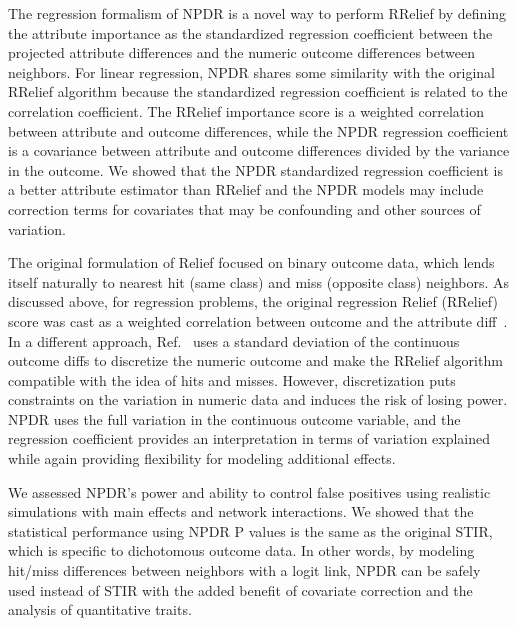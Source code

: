 \documentclass[10pt]{article}
\begin{document}
The regression formalism of NPDR is a novel way to perform RRelief by defining the attribute importance as the standardized regression coefficient between the projected attribute differences and the numeric outcome differences between neighbors.
For linear regression, NPDR shares some similarity with the original RRelief algorithm because the standardized regression coefficient is related to the correlation coefficient.
The RRelief importance score is a weighted correlation between attribute and outcome differences, while the NPDR regression coefficient is a covariance between attribute and outcome differences divided by the variance in the outcome.
We showed that the NPDR standardized regression coefficient is a better attribute estimator than RRelief and the NPDR models may include correction terms for covariates that may be confounding and other sources of variation. 

The original formulation of Relief focused on binary outcome data, which lends itself naturally to nearest hit (same class) and miss (opposite class) neighbors.
As discussed above, for regression problems, the original regression Relief (RRelief) score was cast as a weighted correlation between outcome and the attribute diff~\cite{robnik03}.
In a different approach, Ref.~\cite{urbanowicz17} uses a standard deviation of the continuous outcome diffs to discretize the numeric outcome and make the RRelief algorithm compatible with the idea of hits and misses.
However, discretization puts constraints on the variation in numeric data and induces the risk of losing power.
NPDR uses the full variation in the continuous outcome variable, and the regression coefficient provides an interpretation in terms of variation explained while again providing flexibility for modeling additional effects. 

We assessed NPDR's power and ability to control false positives using realistic simulations with main effects and network interactions.
We showed that the statistical performance using NPDR P values is the same as the original STIR, which is specific to dichotomous outcome data.
In other words, by modeling hit/miss differences between neighbors with a logit link, NPDR can be safely used instead of STIR with the added benefit of covariate correction and the analysis of quantitative traits.  
\end{document}
